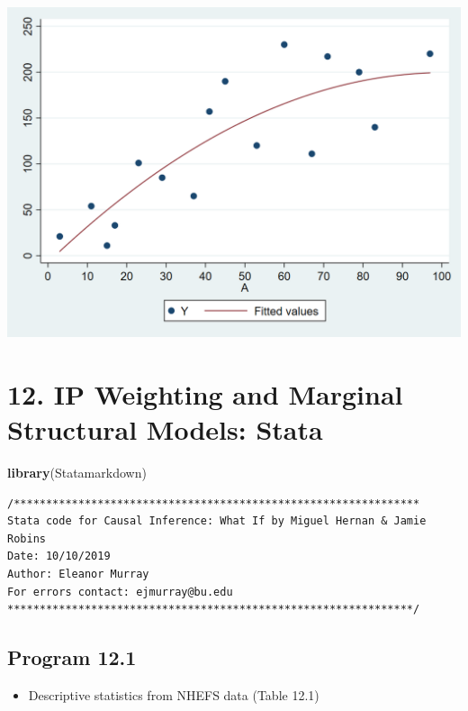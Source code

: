 \documentclass[
  10pt,
]{book}
\newenvironment{Shaded}{\begin{snugshade}}{\end{snugshade}}
\newcommand{\KeywordTok}[1]{\textcolor[rgb]{0.13,0.29,0.53}{\textbf{#1}}}
\newcommand{\NormalTok}[1]{#1}
\providecommand{\tightlist}{%
  \setlength{\itemsep}{0pt}\setlength{\parskip}{0pt}}
\begin{document}
\begin{center}\includegraphics[width=0.85\linewidth]{figs/stata-fig-11-5} \end{center}

\hypertarget{ip-weighting-and-marginal-structural-models-stata}{%
\chapter*{12. IP Weighting and Marginal Structural Models: Stata}\label{ip-weighting-and-marginal-structural-models-stata}}

\begin{Shaded}
\begin{Highlighting}[]
\KeywordTok{library}\NormalTok{(Statamarkdown)}
\end{Highlighting}
\end{Shaded}

\begin{verbatim}
/***************************************************************
Stata code for Causal Inference: What If by Miguel Hernan & Jamie Robins
Date: 10/10/2019
Author: Eleanor Murray 
For errors contact: ejmurray@bu.edu
***************************************************************/
\end{verbatim}

\hypertarget{program-12.1}{%
\section{Program 12.1}\label{program-12.1}}

\begin{itemize}
\tightlist
\item
  Descriptive statistics from NHEFS data (Table 12.1)
\end{itemize}
\end{document}

